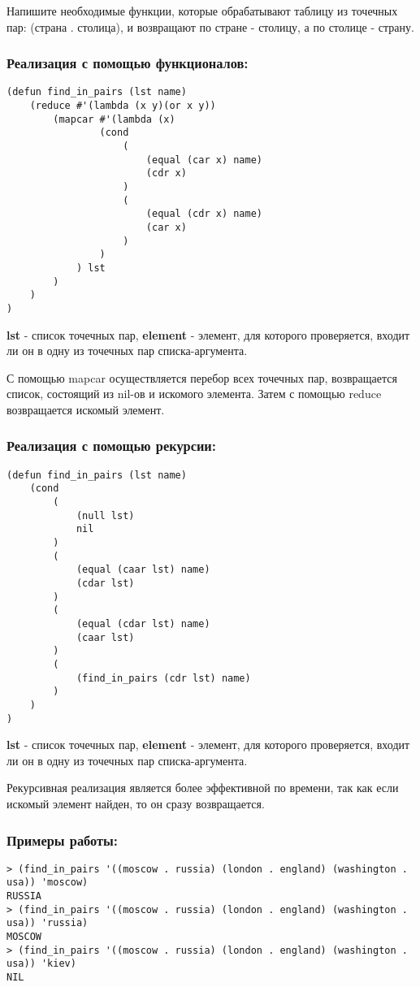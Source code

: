 \documentclass[a4paper,12pt]{article}
\begin{document}
Напишите необходимые функции, которые обрабатывают таблицу из точечных пар: (страна . столица), и возвращают по стране - столицу, а по столице - страну.

\subsubsection*{Реализация с помощью функционалов:}
\begin{lstlisting}[caption=Функция поиска в списке точечных пар]
(defun find_in_pairs (lst name)
	(reduce #'(lambda (x y)(or x y))
		(mapcar #'(lambda (x)
				(cond
					(
						(equal (car x) name)
						(cdr x)
					)
					(
						(equal (cdr x) name)
						(car x)
					)
				)
			) lst
		)
	)
)
\end{lstlisting}
\textbf{lst} - список точечных пар,  \textbf{element} - элемент, для которого проверяется, входит ли он в одну из точечных пар списка-аргумента.

С помощью mapcar осуществляется перебор всех точечных пар, возвращается список, состоящий из nil-ов и искомого элемента. Затем с помощью reduce возвращается искомый элемент.

\subsubsection*{Реализация с помощью рекурсии:}
\begin{lstlisting}[caption=Функция поиска в списке точечных пар]
(defun find_in_pairs (lst name)
	(cond
		(
			(null lst)
			nil
		)
		(
			(equal (caar lst) name)
			(cdar lst)
		)
		(
			(equal (cdar lst) name)
			(caar lst)
		)
		(
			(find_in_pairs (cdr lst) name)
		)
	)
)
\end{lstlisting}
\textbf{lst} - список точечных пар,  \textbf{element} - элемент, для которого проверяется, входит ли он в одну из точечных пар списка-аргумента.

Рекурсивная реализация является более эффективной по времени, так как если искомый элемент найден, то он сразу возвращается.

\newpage

\subsubsection*{Примеры работы:}
\begin{lstlisting}
> (find_in_pairs '((moscow . russia) (london . england) (washington . usa)) 'moscow)
RUSSIA
> (find_in_pairs '((moscow . russia) (london . england) (washington . usa)) 'russia)
MOSCOW
> (find_in_pairs '((moscow . russia) (london . england) (washington . usa)) 'kiev)
NIL
\end{lstlisting}
\end{document}
